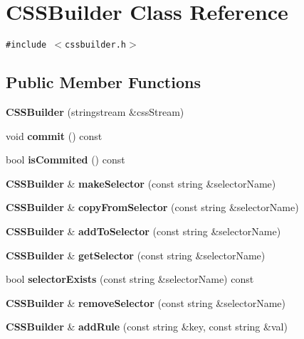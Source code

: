\section{CSSBuilder Class Reference}
\label{classCSSBuilder}
{\tt \#include $<$cssbuilder.h$>$}

\subsection*{Public Member Functions}
\begin{CompactItemize}
\item 
\textbf{CSSBuilder} (stringstream \&cssStream)\label{classCSSBuilder_2cae5b583d2836b807c99a14162a6e0e}

\item 
void \textbf{commit} () const \label{classCSSBuilder_41e4f53240e3228d9a92624b741c7e80}

\item 
bool \textbf{isCommited} () const \label{classCSSBuilder_8eead6b9f540489779551e58c4fc7cfb}

\item 
{\bf CSSBuilder} \& \textbf{makeSelector} (const string \&selectorName)\label{classCSSBuilder_e69c7317c5e156c0f7f24a16aa245c94}

\item 
{\bf CSSBuilder} \& \textbf{copyFromSelector} (const string \&selectorName)\label{classCSSBuilder_fffd03b91b94967051e3e32c65acfa9e}

\item 
{\bf CSSBuilder} \& \textbf{addToSelector} (const string \&selectorName)\label{classCSSBuilder_35c3c052df6a056548b68a18a640d6f9}

\item 
{\bf CSSBuilder} \& \textbf{getSelector} (const string \&selectorName)\label{classCSSBuilder_f071ef4291e8904e54dfa275030bceb2}

\item 
bool \textbf{selectorExists} (const string \&selectorName) const \label{classCSSBuilder_715935f04ef19c2c4052cba8d3f1ad40}

\item 
{\bf CSSBuilder} \& \textbf{removeSelector} (const string \&selectorName)\label{classCSSBuilder_767d82eea0738eb529235b4ff3c9fd1e}

\item 
{\bf CSSBuilder} \& \textbf{addRule} (const string \&key, const string \&val)\label{classCSSBuilder_0e4ab0b778724c554fa85d367c74e720}


\end{CompactItemize}
